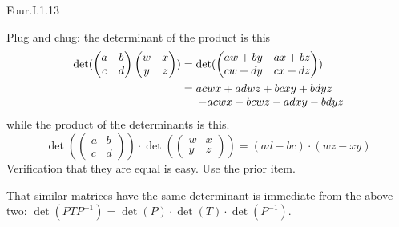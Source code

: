 \begin{ans}{Four.I.1.13}
       \begin{exparts}
        \partsitem Plug and chug:
          the determinant of the product is this
          \begin{align*}
             \det(\begin{pmatrix}
                       a  &b  \\
                       c  &d
                    \end{pmatrix}
                    \begin{pmatrix}
                       w  &x  \\
                       y  &z
                    \end{pmatrix}  )
             &=
             \det(\begin{pmatrix}
                 aw+by  &ax+bz  \\
                 cw+dy  &cx+dz
              \end{pmatrix} )                 \\
             &=
             \begin{array}[t]{@{}l@{}}
                 acwx+adwz+bcxy+bdyz  \\
                 \> -acwx-bcwz-adxy-bdyz
              \end{array}
          \end{align*}
          while the product of the determinants is this.
          \begin{equation*}
             \det(\begin{pmatrix}
                a  &b  \\
                c  &d
             \end{pmatrix})
             \cdot\det(\begin{pmatrix}
                w  &x  \\
                y  &z
             \end{pmatrix})
             =
             (ad-bc)\cdot (wz-xy)
          \end{equation*}
          Verification that they are equal is easy.
        \partsitem Use the prior item.
       \end{exparts}
       \noindent That similar matrices have the same determinant
       is immediate from the above two:
       $
          \det(PTP^{-1})=\det(P)\cdot\det(T)\cdot\det(P^{-1})
       $.
     
\end{ans}

